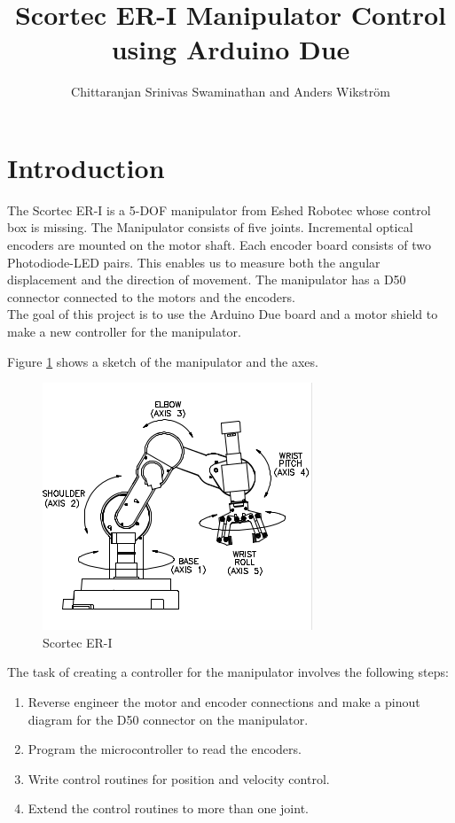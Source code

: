\documentclass[10pt,a4paper]{article}
\author{Chittaranjan Srinivas Swaminathan and Anders Wikström}
\title{Scortec ER-I Manipulator Control using Arduino Due}
\begin{document}
\maketitle
\tableofcontents
\newpage
\section{Introduction}
The Scortec ER-I is a 5-DOF manipulator from Eshed Robotec whose
control box is missing. The Manipulator consists of five
joints. Incremental optical encoders are mounted on the motor
shaft. Each encoder board consists of two Photodiode-LED pairs. This
enables us to measure both the angular displacement and the direction
of movement. The manipulator has a D50 connector connected to the
motors and the encoders.\\

The goal of this project is to use the Arduino
Due board and a motor shield to make a new controller for the
manipulator. 

Figure \ref{fig:axes} shows a sketch of the manipulator and the axes.

\begin{figure}[h]
    \centering
    \includegraphics{axes.png}
    \caption{Scortec ER-I}
    \label{fig:axes}
\end{figure}

The task of creating a controller for the manipulator involves the
following steps:
\begin{enumerate}
\item Reverse engineer the motor and encoder connections and make a
  pinout diagram for the D50 connector on the manipulator.
\item Program the microcontroller to read the encoders.
\item Write control routines for position and velocity control.
\item Extend the control routines to more than one joint.
\end{enumerate}
\end{document}
